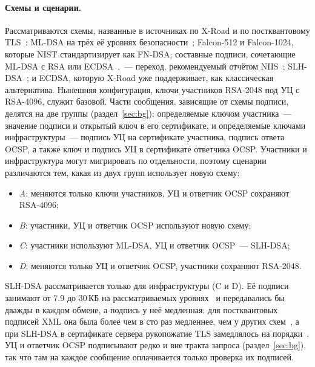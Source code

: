 \documentclass[conference,a4paper]{IEEEtran}
\begin{document}
{\paragraph{Схемы и сценарии.} Рассматриваются схемы, названные в источниках по X-Road и по
постквантовому TLS~\cite{bakhtina2026pqc,snetkov2023,paquin2020,sikeridis2020}: ML-DSA на трёх её
уровнях безопасности~\cite{fips204}; Falcon-512 и Falcon-1024, которые NIST стандартизирует как FN-DSA;
составные подписи, сочетающие ML-DSA с RSA или ECDSA~\cite{rfc10073},~--- переход, рекомендуемый
отчётом NIIS~\cite{bakhtina2026pqc}; SLH-DSA~\cite{fips205}; и ECDSA, которую X-Road уже
поддерживает, как классическая альтернатива. Нынешняя конфигурация, ключи участников RSA-2048 под
УЦ с RSA-4096, служит базовой. Части сообщения, зависящие от схемы подписи, делятся на
две группы (раздел~\ref{sec:bg}): определяемые ключом участника~--- значение подписи и
открытый ключ в его сертификате, и определяемые ключами инфраструктуры~--- подпись
УЦ на сертификате участника, подпись ответа OCSP, а также ключ и подпись УЦ
в сертификате ответчика OCSP. Участники и инфраструктура могут мигрировать
по отдельности, поэтому сценарии различаются тем, какая из двух групп использует новую схему:
\begin{itemize}
  \item \emph{A}: меняются только ключи участников, УЦ и ответчик OCSP сохраняют RSA-4096;
  \item \emph{B}: участники, УЦ и ответчик OCSP используют новую схему;
  \item \emph{C}: участники используют ML-DSA, УЦ и ответчик OCSP~--- SLH-DSA;
  \item \emph{D}: меняются только УЦ и ответчик OCSP, участники сохраняют RSA-2048.
\end{itemize}
SLH-DSA рассматривается только для инфраструктуры (C и D). Её подписи занимают от 7.9 до 30\,КБ на
рассматриваемых уровнях~\cite{fips205} и передавались бы дважды в каждом обмене, а подпись у неё
медленная: для постквантовых подписей XML она была более чем в сто раз медленнее, чем у других
схем~\cite{mueller2024}, а при SLH-DSA в сертификате сервера рукопожатие TLS замедлялось
на порядки~\cite{delgado2026}. УЦ и ответчик OCSP подписывают редко и вне
тракта запроса (раздел~\ref{sec:bg}), так что там на каждое сообщение оплачивается только проверка их
подписей.

}
\end{document}
